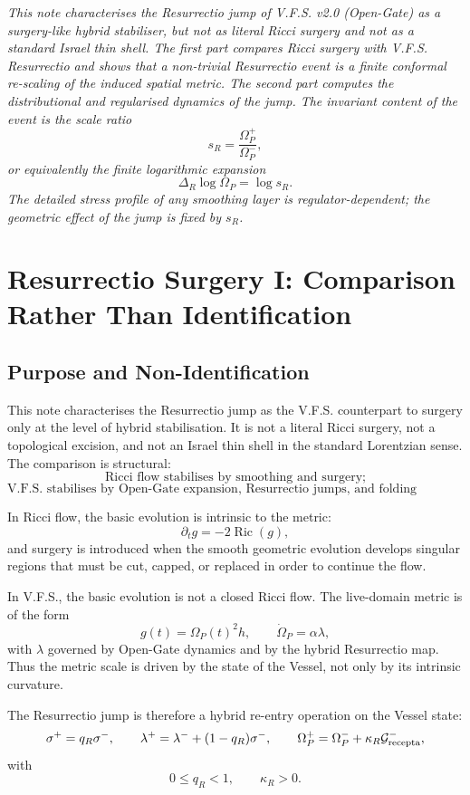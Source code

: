 \documentclass[11pt,a4paper,oneside]{book}
\newcommand{\OmegaP}{\Omega_P}
\newcommand{\Ric}{\operatorname{Ric}}
\theoremstyle{plain}
\theoremstyle{definition}
\theoremstyle{remark}
\begin{document}
\begingroup\small\itshape
This note characterises the Resurrectio jump of V.F.S. v2.0 (Open-Gate)
as a surgery-like hybrid stabiliser, but not as literal Ricci surgery and not
as a standard Israel thin shell. The first part compares Ricci surgery with
V.F.S. Resurrectio and shows that a non-trivial Resurrectio event is a finite
conformal re-scaling of the induced spatial metric. The second part computes
the distributional and regularised dynamics of the jump. The invariant content
of the event is the scale ratio
\[
s_R=\frac{\Omega_P^+}{\Omega_P^-},
\]
or equivalently the finite logarithmic expansion
\[
\Delta_R\log\Omega_P=\log s_R.
\]
The detailed stress profile of any smoothing layer is regulator-dependent;
the geometric effect of the jump is fixed by \(s_R\).
\endgroup\par\medskip

\section{Resurrectio Surgery I: Comparison Rather Than Identification}

\subsection{Purpose and Non-Identification}

This note characterises the Resurrectio jump as the V.F.S. counterpart to
surgery only at the level of hybrid stabilisation. It is not a literal Ricci
surgery, not a topological excision, and not an Israel thin shell in the
standard Lorentzian sense. The comparison is structural:
\[
\text{Ricci flow stabilises by smoothing and surgery;}
\]
\[
\text{V.F.S. stabilises by Open-Gate expansion, Resurrectio jumps, and folding updates.}
\]

In Ricci flow, the basic evolution is intrinsic to the metric:
\[
\partial_t g=-2\Ric(g),
\]
and surgery is introduced when the smooth geometric evolution develops
singular regions that must be cut, capped, or replaced in order to continue
the flow.

In V.F.S., the basic evolution is not a closed Ricci flow. The live-domain
metric is of the form
\[
g(t)=\OmegaP(t)^2 h,
\qquad
\dot{\Omega}_P=\alpha\lambda,
\]
with \(\lambda\) governed by Open-Gate dynamics and by the hybrid
Resurrectio map. Thus the metric scale is driven by the state of the Vessel,
not only by its intrinsic curvature.

The Resurrectio jump is therefore a hybrid re-entry operation on the Vessel
state:
\[
\sigma^+=q_R\sigma^-,
\qquad
\lambda^+=\lambda^-+(1-q_R)\sigma^-,
\qquad
\Omega_P^+=\Omega_P^-+\kappa_R\mathcal G^-_{\rm recepta},
\]
with
\[
0\le q_R<1,
\qquad
\kappa_R>0.
\]
\end{document}
